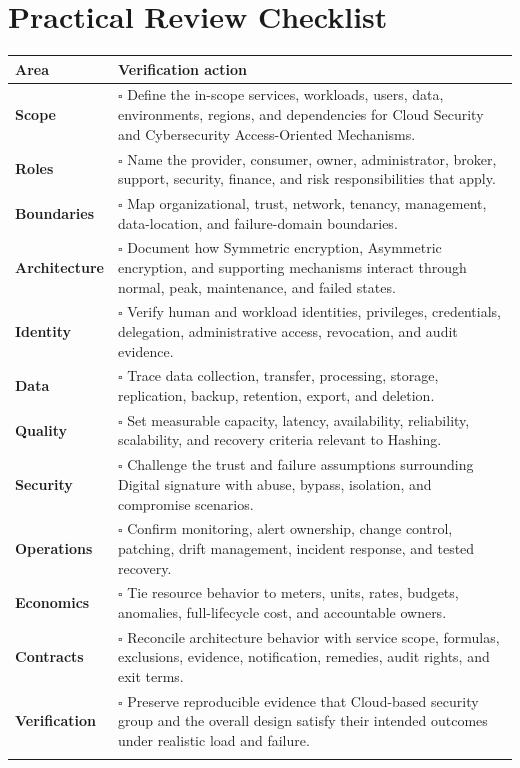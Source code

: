 \documentclass[11pt]{article}
\begin{document}
\section{Practical Review Checklist}
\begin{longtable}{@{}>{\bfseries\color{Teal}}p{}>{\RaggedRight\arraybackslash}p{}@{}}
\toprule\textbf{Area} & \textbf{Verification action}\\\midrule\endhead
Scope & $\square$ Define the in-scope services, workloads, users, data, environments, regions, and dependencies for Cloud Security and Cybersecurity Access-Oriented Mechanisms. \\\addlinespace[2pt]
Roles & $\square$ Name the provider, consumer, owner, administrator, broker, support, security, finance, and risk responsibilities that apply. \\\addlinespace[2pt]
Boundaries & $\square$ Map organizational, trust, network, tenancy, management, data-location, and failure-domain boundaries. \\\addlinespace[2pt]
Architecture & $\square$ Document how Symmetric encryption, Asymmetric encryption, and supporting mechanisms interact through normal, peak, maintenance, and failed states. \\\addlinespace[2pt]
Identity & $\square$ Verify human and workload identities, privileges, credentials, delegation, administrative access, revocation, and audit evidence. \\\addlinespace[2pt]
Data & $\square$ Trace data collection, transfer, processing, storage, replication, backup, retention, export, and deletion. \\\addlinespace[2pt]
Quality & $\square$ Set measurable capacity, latency, availability, reliability, scalability, and recovery criteria relevant to Hashing. \\\addlinespace[2pt]
Security & $\square$ Challenge the trust and failure assumptions surrounding Digital signature with abuse, bypass, isolation, and compromise scenarios. \\\addlinespace[2pt]
Operations & $\square$ Confirm monitoring, alert ownership, change control, patching, drift management, incident response, and tested recovery. \\\addlinespace[2pt]
Economics & $\square$ Tie resource behavior to meters, units, rates, budgets, anomalies, full-lifecycle cost, and accountable owners. \\\addlinespace[2pt]
Contracts & $\square$ Reconcile architecture behavior with service scope, formulas, exclusions, evidence, notification, remedies, audit rights, and exit terms. \\\addlinespace[2pt]
Verification & $\square$ Preserve reproducible evidence that Cloud-based security group and the overall design satisfy their intended outcomes under realistic load and failure. \\\addlinespace[2pt]
\bottomrule
\end{longtable}
\end{document}
